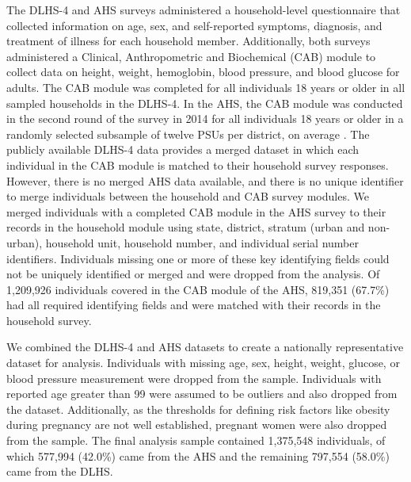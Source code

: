 \documentclass[10pt,letterpaper]{article}
\numberwithin{equation}{section}
\begin{document}
The DLHS-4 and AHS surveys administered a household-level questionnaire that collected information on age, sex, and self-reported symptoms, diagnosis, and treatment of illness for each household member. Additionally, both surveys administered a Clinical, Anthropometric and Biochemical (CAB) module to collect data on height, weight, hemoglobin, blood pressure, and blood glucose for adults. The CAB module was completed for all individuals 18 years or older in all sampled households in the DLHS-4. In the AHS, the CAB module was conducted in the second round of the survey in 2014 for all individuals 18 years or older in a randomly selected subsample of twelve PSUs per district, on average \cite{noauthor_annual_2014}. The publicly available DLHS-4 data provides a merged dataset in which each individual in the CAB module is matched to their household survey responses. However, there is no merged AHS data available, and there is no unique identifier to merge individuals between the household and CAB survey modules. We merged individuals with a completed CAB module in the AHS survey to their records in the household module using state, district, stratum (urban and non-urban), household unit, household number, and individual serial number identifiers. Individuals missing one or more of these key identifying fields could not be uniquely identified or merged and were dropped from the analysis. Of 1,209,926 individuals covered in the CAB module of the AHS, 819,351 (\num{67.7}\%) had all required identifying fields and were matched with their records in the household survey.  

We combined the DLHS-4 and AHS datasets to create a nationally representative dataset for analysis. Individuals with missing age, sex, height, weight, glucose, or blood pressure measurement were dropped from the sample. Individuals with reported age greater than 99 were assumed to be outliers and also dropped from the dataset. Additionally, as the thresholds for defining risk factors like obesity during pregnancy are not well established, pregnant women were also dropped from the sample. The final analysis sample contained 1,375,548 individuals, of which 577,994 (\num{42.0}\%) came from the AHS and the remaining 797,554 (\num{58.0}\%) came from the DLHS.
\end{document}
